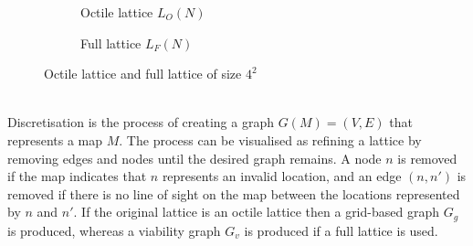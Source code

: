 \documentclass[12pt,notitlepage]{report}
\begin{document}
\begin{figure}
  \begin{subfigure}{.5\textwidth}
    \centering
    \caption[Map]{Octile lattice $L_{O}(N)$}
  \end{subfigure}
  \begin{subfigure}{.5\textwidth}
    \centering
    \caption{Full lattice $L_{F}(N)$}
  \end{subfigure}
  \caption{Octile lattice and full lattice of size $4^{2}$}
\end{figure}

\\
\noindent
Discretisation is the process of creating a graph $G(M)=(V,E)$ that represents a map $M$. The process can be visualised as refining a lattice by removing edges and nodes until the desired graph remains. A node $n$ is removed if the map indicates that $n$ represents an invalid location, and an edge $(n,n')$ is removed if there is no line of sight on the map between the locations represented by $n$ and $n'$. If the original lattice is an octile lattice then a grid-based graph $G_{g}$ is produced, whereas a viability graph $G_{v}$ is produced if a full lattice is used.\\
\end{document}
